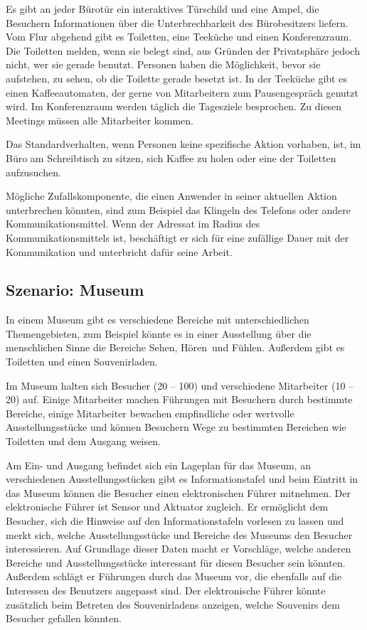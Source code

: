 Es gibt an jeder Bürotür ein interaktives Türschild und eine Ampel, die Besuchern Informationen über die Unterbrechbarkeit des Bürobesitzers liefern.
Vom Flur abgehend gibt es Toiletten, eine Teeküche und einen Konferenzraum. Die Toiletten melden, wenn sie belegt sind, aus Gründen der Privatsphäre jedoch nicht, wer sie gerade benutzt. Personen haben die Möglichkeit, bevor sie aufstehen, zu sehen, ob die Toilette gerade besetzt ist. In der Teeküche gibt es einen Kaffeeautomaten, der gerne von Mitarbeitern zum Pausengespräch genutzt wird. Im Konferenzraum werden täglich die Tagesziele besprochen. Zu diesen Meetings müssen alle Mitarbeiter kommen.

Das Standardverhalten, wenn Personen keine spezifische Aktion vorhaben, ist, im Büro am Schreibtisch zu sitzen, sich Kaffee zu holen oder eine der Toiletten aufzusuchen.

Mögliche Zufallskomponente, die einen Anwender in seiner aktuellen Aktion unterbrechen könnten, sind zum Beispiel das Klingeln des Telefons oder andere Kommunikationsmittel. Wenn der Adressat im Radius des Kommunikationsmittels ist, beschäftigt er sich für eine zufällige Dauer mit der Kommunikation und unterbricht dafür seine Arbeit.

\subsection*{Szenario: Museum}
 
In einem Museum gibt es verschiedene Bereiche mit unterschiedlichen Themengebieten, zum Beispiel könnte es in einer Ausstellung über die menschlichen Sinne die Bereiche \glqq Sehen\grqq , \glqq Hören\grqq\ und \glqq Fühlen\grqq. Außerdem gibt es Toiletten und einen Souvenirladen.

Im Museum halten sich Besucher (20 – 100) und verschiedene Mitarbeiter (10 – 20) auf. Einige Mitarbeiter machen Führungen mit Besuchern durch bestimmte Bereiche, einige Mitarbeiter bewachen empfindliche oder wertvolle Ausstellungsstücke und können Besuchern Wege zu bestimmten Bereichen wie Toiletten und dem Ausgang weisen.

Am Ein- und Ausgang befindet sich ein Lageplan für das Museum, an verschiedenen Ausstellungsstücken gibt es Informationstafel und beim Eintritt in das Museum können die Besucher einen elektronischen Führer mitnehmen. Der elektronische Führer ist Sensor und Aktuator zugleich. Er ermöglicht dem Besucher, sich die Hinweise auf den Informationstafeln vorlesen zu lassen und merkt sich, welche Ausstellungsstücke und Bereiche des Museums den Besucher interessieren. Auf Grundlage dieser Daten macht er Vorschläge, welche anderen Bereiche und Ausstellungsstücke interessant für diesen Besucher sein könnten. Außerdem schlägt er Führungen durch das Museum vor, die ebenfalls auf die Interessen des Benutzers angepasst sind. Der elektronische Führer könnte zusätzlich beim Betreten des Souvenirladens anzeigen, welche Souvenirs dem Besucher gefallen könnten.

